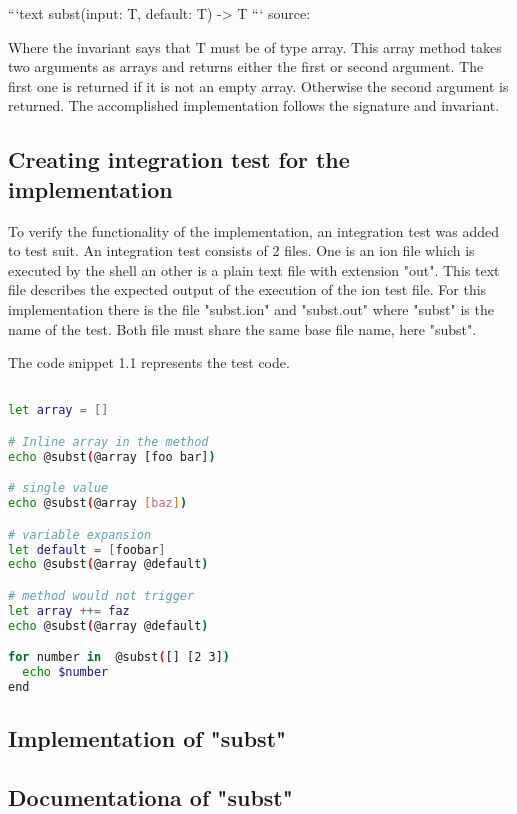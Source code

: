 ```text
subst(input: T, default: T) -> T
```
source: \cite{issue_subst_request}

Where the invariant says that T must be of type array.
This array method takes two arguments as arrays and returns either the first or second argument.
The first one is returned if it is not an empty array. Otherwise the second argument is returned.
The accomplished implementation follows the signature and invariant.

\subsection{Creating integration test for the implementation}\label{subst_test}

To verify the functionality of the implementation, an integration test was added to test suit.
An integration test consists of 2 files. One is an ion file which is executed by the shell an other is a plain text file with extension "out".
This text file describes the expected output of the execution of the ion test file.
For this implementation there is the file "subst.ion" and "subst.out"
where "subst" is the name of the test. Both file must share the same base file name, here "subst".

The code snippet 1.1 represents the test code.

\begin{lstlisting}[language=sh,caption={integration test for subst method. Source: \cite{ion_shell_subst_ion_test}},captionpos=b]

let array = []

# Inline array in the method
echo @subst(@array [foo bar])

# single value
echo @subst(@array [baz])

# variable expansion
let default = [foobar]
echo @subst(@array @default)

# method would not trigger
let array ++= faz
echo @subst(@array @default)

for number in  @subst([] [2 3])
  echo $number
end

\end{lstlisting}

\subsection{Implementation of "subst"}

\subsection{Documentationa of "subst"}
